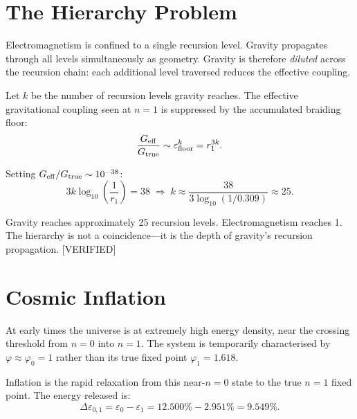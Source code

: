 \documentclass[prd,twocolumn,preprintnumbers,amsmath,amssymb]{revtex4-2}
\newcommand{\verified}{\textcolor{green!60!black}{[VERIFIED]}}
\begin{document}
\section{The Hierarchy Problem}
\label{sec:hierarchy}

Electromagnetism is confined to a single recursion level.  Gravity
propagates through all levels simultaneously as geometry.  Gravity
is therefore \emph{diluted} across the recursion chain: each
additional level traversed reduces the effective coupling.

Let $k$ be the number of recursion levels gravity reaches.  The
effective gravitational coupling seen at $n=1$ is suppressed by
the accumulated braiding floor:
\begin{equation}
  \frac{G_{\rm eff}}{G_{\rm true}}
    \sim \varepsilon_{\rm floor}^k
    = r_1^{3k}.
  \label{eq:hierarchy}
\end{equation}

Setting $G_{\rm eff}/G_{\rm true} \sim 10^{-38}$:
\begin{equation}
  3k \log_{10}\!\left(\frac{1}{r_1}\right)
    = 38
  \;\Rightarrow\;
  k \approx \frac{38}{3\log_{10}(1/0.309)}
    \approx 25.
  \label{eq:klevels}
\end{equation}

Gravity reaches approximately 25 recursion levels.  Electromagnetism
reaches 1.  The hierarchy is not a coincidence---it is the depth of
gravity's recursion propagation.  \verified

\section{Cosmic Inflation}
\label{sec:inflation}

At early times the universe is at extremely high energy density, near
the crossing threshold from $n=0$ into $n=1$.  The system is
temporarily characterised by $\varphi \approx \varphi_0 = 1$ rather
than its true fixed point $\varphi_1 = 1.618$.

Inflation is the rapid relaxation from this near-$n=0$ state to the
true $n=1$ fixed point.  The energy released is:
\begin{equation}
  \Delta\varepsilon_{0,1} = \varepsilon_0 - \varepsilon_1
    = 12.500\% - 2.951\% = 9.549\%.
  \label{eq:inflation_energy}
\end{equation}
\end{document}
